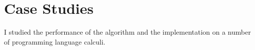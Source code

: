 \chapter{Case Studies}\label{chapter:case-studies}
I studied the performance of the algorithm and the implementation on a number of programming language calculi. 